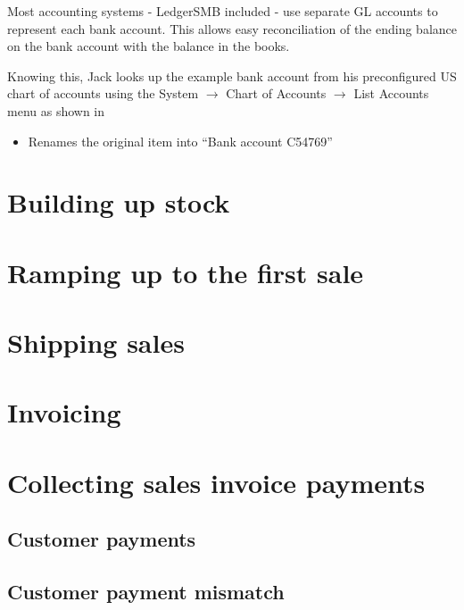 Most accounting systems - LedgerSMB included - use separate GL accounts to represent
each bank account. This allows easy reconciliation of the ending balance on the bank
account with the balance in the books.

Knowing this, Jack looks up the example bank account from his preconfigured US chart of
accounts using the System $\rightarrow$ Chart of Accounts $\rightarrow$ List Accounts menu as
shown in %

\begin{itemize}
\item Renames the original item into ``Bank account C54769''
\end{itemize}


\chapter{Building up stock}

\chapter{Ramping up to the first sale}


\chapter{Shipping sales}

\chapter{Invoicing}

\chapter{Collecting sales invoice payments}

\section{Customer payments}

\section{Customer payment mismatch}



